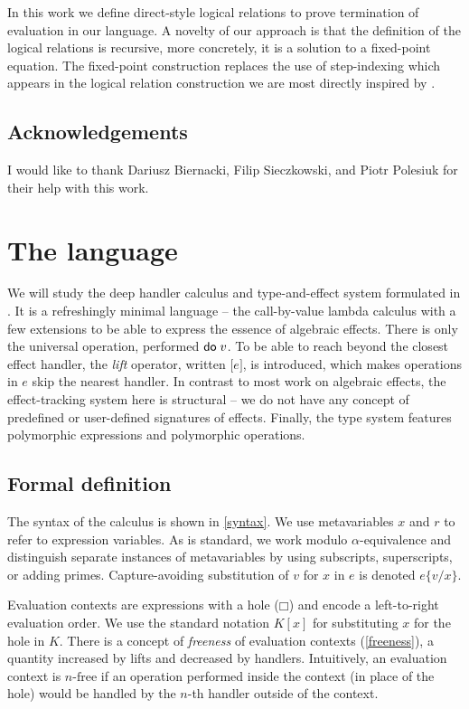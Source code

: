\documentclass[a4paper, 11pt,titlepage, openright, twoside]{report}
\newcommand{\keyword}[1]{\textsf{\textup{#1}}}
\newcommand{\Do}{\keyword{do}\;}
\newcommand{\Lift}[1]{\boldsymbol{[}#1\boldsymbol{]}}
\newcommand{\subst}[2]{\{#1/#2\}}
\newcommand{\Free}{\textrm{-}\mathrm{free}}
\newcommand{\+}{\enspace}
\begin{document}
In this work we define direct-style logical relations
to prove termination
of evaluation in our language.
A novelty of our approach
is that the definition of the logical relations
is recursive, more concretely, it is a solution to a fixed-point equation.
The fixed-point construction replaces the use of step-indexing
which appears in the logical relation construction we are most directly inspired by \cite{hwc}.

\section{Acknowledgements}
I would like to thank Dariusz Biernacki, Filip Sieczkowski, and Piotr Polesiuk
for their help with this work.

\chapter{The language}\label{chap:language}
We will study the deep handler calculus and type-and-effect system formulated
in \cite{fscd19}.
It is a refreshingly minimal language – the call-by-value lambda calculus with a few extensions
to be able to express the essence of algebraic effects.
There is only the universal operation, performed $\Do v$.
To be able to reach beyond the closest effect handler,
the \textit{lift} operator, written $\Lift{e}$, is introduced,
which makes operations in $e$ skip the nearest handler.
In contrast to most work on algebraic effects, the effect-tracking system here is structural –
we do not have any concept of predefined or user-defined signatures of effects.
Finally, the type system features polymorphic expressions and polymorphic operations.

\section{Formal definition}

The syntax of the calculus is shown in \cref{syntax}.
We use metavariables $x$ and $r$ to refer to expression variables.
As is standard, we work modulo $α$-equivalence and distinguish separate instances
of metavariables by using subscripts, superscripts, or adding primes.
Capture-avoiding substitution of $v$ for $x$ in $e$ is denoted $e\subst{v}{x}$.

Evaluation contexts are expressions with a hole ($□$) and
encode a left-to-right evaluation order.
We use the standard notation $K[x]$ for substituting $x$ for the hole in $K$.
There is a concept of {\em freeness} of evaluation contexts (\cref{freeness}),
a quantity increased by lifts and decreased by handlers.
Intuitively, an evaluation context is $n\Free$
if an operation performed inside the context (in place of the hole) %
would be handled by the $n$-th handler outside of the context.
\end{document}

